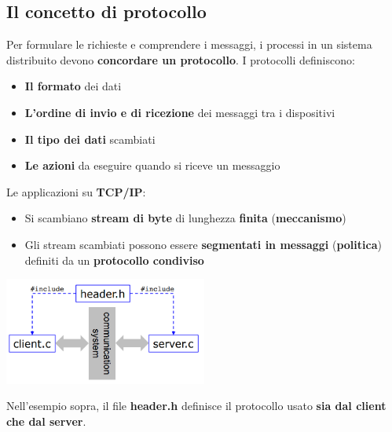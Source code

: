 \documentclass[12pt]{article}
\begin{document}
\subsection{Il concetto di protocollo}
Per formulare le richieste e comprendere i messaggi, i processi in un sistema distribuito devono \textbf{concordare un protocollo}. I protocolli definiscono:
\begin{itemize}
    \item \textbf{Il formato} dei dati
    \item \textbf{L'ordine di invio e di ricezione} dei messaggi tra i dispositivi
    \item \textbf{Il tipo dei dati} scambiati
    \item \textbf{Le azioni} da eseguire quando si riceve un messaggio
\end{itemize}
Le applicazioni su \textbf{TCP/IP}:
\begin{itemize}
    \item Si scambiano \textbf{stream di byte} di lunghezza \textbf{finita} (\textbf{meccanismo})
    \item Gli stream scambiati possono essere \textbf{segmentati in messaggi} (\textbf{politica}) definiti da un \textbf{protocollo condiviso}
\end{itemize}
\begin{center}
    \includegraphics[width = 0.50\textwidth]{Images/20.PNG}
\end{center}
Nell'esempio sopra, il file \textbf{header.h} definisce il protocollo usato \textbf{sia dal client che dal server}.
\end{document}
